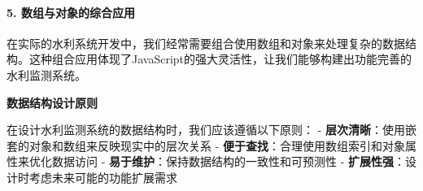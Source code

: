 \begin{Shaded}
\begin{Highlighting}[]
\OperatorTok{=}\NormalTok{ [}\OperatorTok{,} \OperatorTok{,} \OperatorTok{,} \OperatorTok{,} \NormalTok{]}\OperatorTok{;}

\OperatorTok{=}\OperatorTok{,}\OperatorTok{,}\OperatorTok{,}\KeywordTok{=\textgreater{}}\NormalTok{ \{}
\OperatorTok{+=}\OperatorTok{;}
    \OperatorTok{===} \OperatorTok{{-}}  \OperatorTok{/} \OperatorTok{:}\OperatorTok{;}
\NormalTok{\}}\OperatorTok{,} \NormalTok{)}\OperatorTok{;}

\OperatorTok{=}\OperatorTok{,}\KeywordTok{=\textgreater{}} 
\OperatorTok{\textgreater{}}\OperatorTok{:}\OperatorTok{,}\NormalTok{ readings[}\NormalTok{])}\OperatorTok{;}

\NormalTok{(}\NormalTok{)}\OperatorTok{;}
\end{Highlighting}
\end{Shaded}

\paragraph{5. 数组与对象的综合应用}\label{ux6570ux7ec4ux4e0eux5bf9ux8c61ux7684ux7efcux5408ux5e94ux7528}

在实际的水利系统开发中，我们经常需要组合使用数组和对象来处理复杂的数据结构。这种组合应用体现了JavaScript的强大灵活性，让我们能够构建出功能完善的水利监测系统。

\textbf{数据结构设计原则}

在设计水利监测系统的数据结构时，我们应该遵循以下原则： - \textbf{层次清晰}：使用嵌套的对象和数组来反映现实中的层次关系 - \textbf{便于查找}：合理使用数组索引和对象属性来优化数据访问 - \textbf{易于维护}：保持数据结构的一致性和可预测性 - \textbf{扩展性强}：设计时考虑未来可能的功能扩展需求

